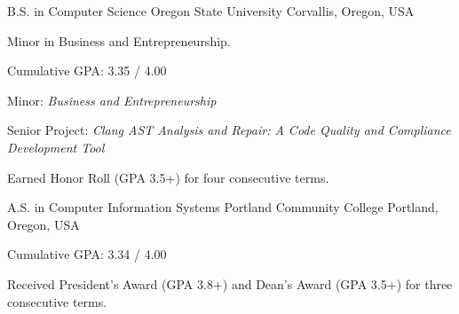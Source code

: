 \begin{cventries}
    \cventry
    {B.S. in Computer Science} %
    {Oregon State University} %
    {Corvallis, Oregon, USA} %
    {} %
    {
      \begin{briefSection}
        \begin{cvitems} %
        	\item {Minor in Business and Entrepreneurship.}
        \end{cvitems}  
      \end{briefSection}
      \begin{detailSection}
        \begin{cvitems} %
          \item {Cumulative GPA: 3.35 / 4.00}
          \item {Minor: \textit {Business and Entrepreneurship}}
          \item {Senior Project: \textit{Clang AST Analysis and Repair: A Code Quality and Compliance Development Tool}}
      	  \item {Earned Honor Roll (GPA 3.5+) for four consecutive terms.}
        \end{cvitems}
      \end{detailSection}
    }

	\cventry
    {A.S. in Computer Information Systems} %
    {Portland Community College} %
    {Portland, Oregon, USA} %
    {} %
    {
      \begin{detailSection}
        \begin{cvitems} %
      	  \item {Cumulative GPA: 3.34 / 4.00}
    	  \item {Received President's Award (GPA 3.8+) and Dean's Award (GPA 3.5+) for three consecutive terms.}
        \end{cvitems}  
      \end{detailSection}
    }


\end{cventries}
